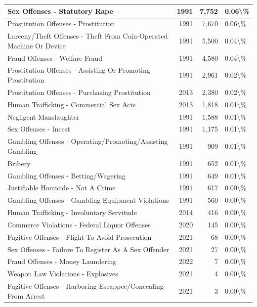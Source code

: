 \documentclass[
]{krantz}
\begin{document}
\begin{longtable}[t]{l|r|r|l}
\hline
Sex Offenses - Statutory Rape & 1991 & 7,752 & 0.06\textbackslash{}\%\\
\hline
Prostitution Offenses - Prostitution & 1991 & 7,670 & 0.06\textbackslash{}\%\\
\hline
Larceny/Theft Offenses - Theft From Coin-Operated Machine Or Device & 1991 & 5,500 & 0.04\textbackslash{}\%\\
\hline
Fraud Offenses - Welfare Fraud & 1991 & 4,580 & 0.04\textbackslash{}\%\\
\hline
Prostitution Offenses - Assisting Or Promoting Prostitution & 1991 & 2,961 & 0.02\textbackslash{}\%\\
\hline
Prostitution Offenses - Purchasing Prostitution & 2013 & 2,380 & 0.02\textbackslash{}\%\\
\hline
Human Trafficking - Commercial Sex Acts & 2013 & 1,818 & 0.01\textbackslash{}\%\\
\hline
Negligent Manslaughter & 1991 & 1,588 & 0.01\textbackslash{}\%\\
\hline
Sex Offenses - Incest & 1991 & 1,175 & 0.01\textbackslash{}\%\\
\hline
Gambling Offenses - Operating/Promoting/Assisting Gambling & 1991 & 909 & 0.01\textbackslash{}\%\\
\hline
Bribery & 1991 & 652 & 0.01\textbackslash{}\%\\
\hline
Gambling Offenses - Betting/Wagering & 1991 & 649 & 0.01\textbackslash{}\%\\
\hline
Justifiable Homicide - Not A Crime & 1991 & 617 & 0.00\textbackslash{}\%\\
\hline
Gambling Offenses - Gambling Equipment Violations & 1991 & 560 & 0.00\textbackslash{}\%\\
\hline
Human Trafficking - Involuntary Servitude & 2014 & 416 & 0.00\textbackslash{}\%\\
\hline
Commerce Violations - Federal Liquor Offenses & 2020 & 145 & 0.00\textbackslash{}\%\\
\hline
Fugitive Offenses - Flight To Avoid Prosecution & 2021 & 68 & 0.00\textbackslash{}\%\\
\hline
Sex Offenses - Failure To Register As A Sex Offender & 2021 & 27 & 0.00\textbackslash{}\%\\
\hline
Fraud Offenses - Money Laundering & 2022 & 7 & 0.00\textbackslash{}\%\\
\hline
Weapon Law Violations - Explosives & 2021 & 4 & 0.00\textbackslash{}\%\\
\hline
Fugitive Offenses - Harboring Escappee/Concealing From Arrest & 2021 & 3 & 0.00\textbackslash{}\%\\

\end{longtable}
\end{document}
